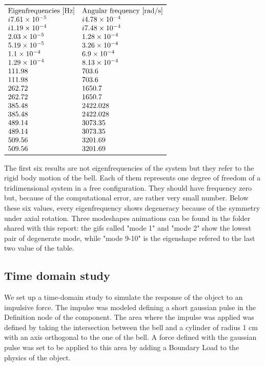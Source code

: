 \documentclass[a4paper]{article}
\begin{document}
\begin{table}[h]
	\centering
	$\begin{array}{ll}
		\toprule
		\text{Eigenfrequencies [Hz]} & \text{Angular frequency [rad/s]}\\
				i7.61\times 10^{-5} & i4.78\times 10^{-4} \\
		i1.19\times 10^{-4} &  i7.48\times 10^{-4} \\
		2.03\times 10^{-5} & 1.28\times 10^{-4} \\
		5.19\times 10^{-5} & 3.26\times 10^{-4} \\
		1.1\times 10^{-4} & 6.9\times 10^{-4} \\
		1.29\times 10^{-4} & 8.13\times 10^{-4}  \\
		111.98  &  703.6 \\
		111.98  &  703.6 \\
		262.72 &   1650.7\\ 
		262.72 &   1650.7\\  
		385.48 &   2422.028 \\   
		385.48 &   2422.028 \\ 
		489.14 &  3073.35 \\
     	489.14 &  3073.35 \\
     	509.56  &  3201.69 \\
     	509.56  &  3201.69 \\
		\bottomrule
	\end{array}$
\caption{}
\label{tab:freq}
\end{table}

The first six results are not eigenfrequencies of the system but they refer to the rigid body motion of the bell. Each of them represents one degree of freedom of a tridimensional system in a free configuration. They should have frequency zero but, because of the computational error, are rather very small number. Below these six values, every eigenfrequency shows degeneracy because of the symmetry under axial rotation. Three modeshapes animations can be found in the folder shared with this report: the gifs called "mode 1" and "mode 2" show the lowest pair of degenerate mode, while "mode 9-10" is the eigenshape refered to the last two value of the table. 


\subsection{Time domain study}
We set up a time-domain study to simulate the response of the object to an impulsive force. The impulse was modeled defining a short gaussian pulse in the Definition node of the component. The area where the impulse was applied was defined by taking the intersection between the bell and a cylinder of radius 1 cm with an axis orthogonal to the one of the bell. A force defined with the gaussian pulse was set to be applied to this area by adding a Boundary Load to the physics of the object.
\end{document}
